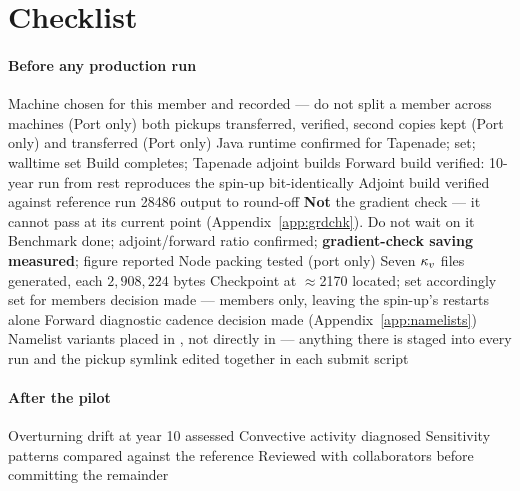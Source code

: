 \section{Checklist}

\paragraph{Before any production run}
\begin{itemize}[leftmargin=2em]
  \ck Machine chosen for this member and recorded --- do not split a member
      across machines
  \ck (Port only) both pickups transferred, verified, second copies kept
  \ck (Port only)  and
       transferred
  \ck (Port only) Java runtime confirmed for Tapenade; 
      set; walltime set
  \ck Build completes; Tapenade adjoint builds
  \ck Forward build verified: 10-year run from rest reproduces the spin-up
      bit-identically
  \ck Adjoint build verified against reference run 28486 output to round-off
  \ck \textbf{Not} the gradient check --- it cannot pass at its current point
      (Appendix~\ref{app:grdchk}). Do not wait on it
  \ck Benchmark done; adjoint/forward ratio confirmed; \textbf{gradient-check
      saving measured}; figure reported
  \ck Node packing tested (port only)
  \ck Seven $\kappa_{v}$ files generated, each $2{,}908{,}224$ bytes
  \ck Checkpoint at $\approx$2170 located;
       set accordingly
  \ck {} set for members
  \ck {} decision made --- members only, leaving the spin-up's
      restarts alone
  \ck Forward diagnostic cadence decision made (Appendix~\ref{app:namelists})
  \ck Namelist variants placed in ,
      not directly in  --- anything there is staged into every run
  \ck {} and the pickup symlink edited together in each submit script
\end{itemize}

\paragraph{After the pilot}
\begin{itemize}[leftmargin=2em]
  \ck Overturning drift at year 10 assessed
  \ck Convective activity diagnosed
  \ck Sensitivity patterns compared against the reference
  \ck Reviewed with collaborators before committing the remainder
\end{itemize}

